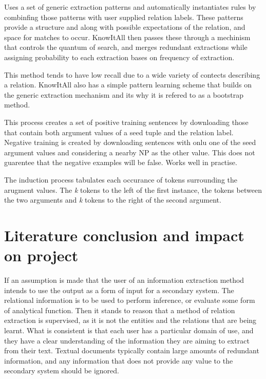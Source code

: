 \documentclass{ecmm427_assignment}
\begin{document}
Uses a set of generic extraction patterns and automatically\cite{supervisedDistant} instantiates rules by combinfing those patterns with user supplied relation labels. These patterns provide a structure and along with possible expectations of the relation, and space for matches to occur. KnowItAll then passes these through a mechinism that controls the quantum of search, and merges redundant extractions while assigning probability to each extraction bases on frequency of extraction.

This method tends to have low recall due to a wide variety of contects describing a relation. KnowItAll also has a simple pattern learning scheme that builds on the generic extraction mechanism and its why it is refered to as a bootstrap method.

This process creates a set of positive training sentences by downloading those that contain both argument values of a seed tuple and the relation label. Negative training is created by downloading sentences with onlu one of the seed argument values and considering a nearby NP as the other value. This does not guarentee that the negative examples will be false. Works well in practise.

The induction process tabulates each occurance of tokens surrounding the arugment values. The \textit{k} tokens to the left of the first instance, the tokens between the two arguments and \textit{k} tokens to the right of the second argument.

\section{Literature conclusion and impact on project}

If an assumption is made that the user of an information extraction method intends to use the output as a form of input for a secondary system. The relational information is to be used to perform inference, or evaluate some form of analytical function. Then it stands to reason that a method of relation extraction is supervised, as it is not the entities and the relations that are being learnt. What is consistent is that each user has a particular domain of use, and they have a clear understanding of the information they are aiming to extract from their text. Textual documents typically contain large amounts of redundant information, and any information that does not provide any value to the secondary system should be ignored.
\end{document}
